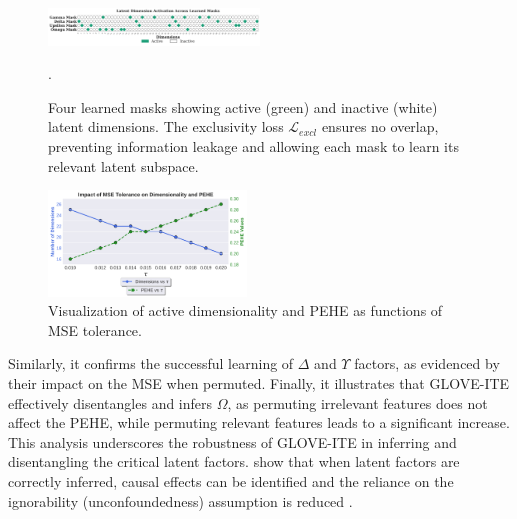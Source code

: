 \documentclass[doubleblind]{ecai}
\begin{document}
	\begin{figure}[h]
		\centering
		
		\includegraphics[width=0.5\textwidth]{Images/orthogonal_new.png}
		
		\caption{	
			Four learned masks showing active (green) and inactive (white) latent dimensions. The exclusivity loss $\mathcal{L}_{\mathit{excl}}$ ensures no overlap, preventing information leakage and allowing each mask to learn its relevant latent subspace.}
		
		.
		
		
		\label{fig:ortho}
		
	\end{figure}


	
	
	\begin{figure}[h]
		\centering
		
		\includegraphics[width=0.47\textwidth]{Images/tol_vs_dims_pehe.png}
		
		
		
		\caption{Visualization of active dimensionality and PEHE as functions of MSE tolerance.}
		
		\label{fig:tolerance}
		
	\end{figure}
	
	Similarly, it confirms the successful learning of $\Delta$ and $\Upsilon$ factors, as evidenced by their impact on the MSE when permuted. Finally, it illustrates that GLOVE-ITE effectively disentangles and infers $\Omega$, as permuting irrelevant features does not affect the PEHE, while permuting relevant features leads to a significant increase. This analysis underscores the robustness of GLOVE-ITE in inferring and disentangling the critical latent factors. \citet{CEVAE,lowe2022amortized} show that when latent factors are correctly inferred, causal effects can be identified and the reliance on the ignorability (unconfoundedness) assumption is reduced \citep{vowels2021targeted}. 
	
\end{document}
